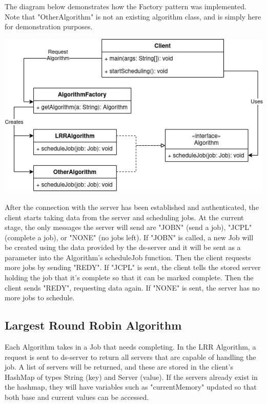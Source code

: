\vspace{.2cm}
The diagram below demonstrates how the Factory pattern was implemented. Note that "OtherAlgorithm" is not an existing algorithm class, and is simply here for demonstration purposes.
\begin{center}
    \includegraphics[scale=.7]{AlgorithmFactory.png}
\end{center}

After the connection with the server has been established and authenticated, the client starts taking data from the server and scheduling jobs. At the current stage, the only messages the server will send are "JOBN" (send a job), "JCPL" (complete a job), or "NONE" (no jobs left). If "JOBN" is called, a new Job will be created using the data provided by the ds-server and it will be sent as a parameter into the Algorithm's scheduleJob function. Then the client requests more jobs by sending "REDY". If "JCPL" is sent, the client tells the stored server holding the job that it's complete so that it can be marked complete. Then the client sends "REDY", requesting data again. If "NONE" is sent, the server has no more jobs to schedule.

\subsection{Largest Round Robin Algorithm}
\vspace{.2cm}
Each Algorithm takes in a Job that needs completing. In the LRR Algorithm, a request is sent to ds-server to return all servers that are capable of handling the job. A list of servers will be returned, and these are stored in the client's HashMap of types String (key) and Server (value). If the servers already exist in the hashmap, they will have variables such as "currentMemory" updated so that both base and current values can be accessed. \\


